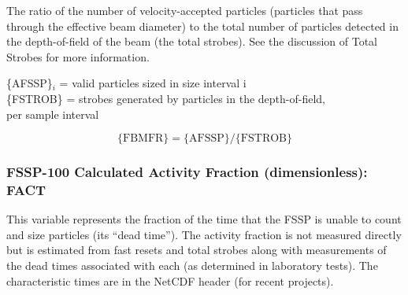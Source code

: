 \documentclass[
  english,
]{book}
\begin{document}
The ratio of the number of velocity-accepted particles (particles that pass through the effective beam diameter) to the total number of particles detected in the depth-of-field of the beam (the total strobes). See the discussion of Total Strobes for more information.

\{AFSSP\}\(_{i}\) = valid particles sized in size interval i\\
\{FSTROB\} = strobes generated by particles in the depth-of-field,\\
\hspace*{0.333em}\hspace*{0.333em}\hspace*{0.333em}\hspace*{0.333em}\hspace*{0.333em}\hspace*{0.333em}\hspace*{0.333em}\hspace*{0.333em}\hspace*{0.333em}\hspace*{0.333em}\hspace*{0.333em}\hspace*{0.333em}\hspace*{0.333em}\hspace*{0.333em}per sample interval

\begin{equation}
\mathrm{\{FBMFR\}=\{AFSSP\}/\{FSTROB\}}
\label{eq:FBMFRbox}
\end{equation}

\hypertarget{fact}{%
\subsubsection*{FSSP-100 Calculated Activity Fraction (dimensionless): FACT}\label{fact}}

This variable represents the fraction of the time that the FSSP is unable to count and size particles (its ``dead time''). The activity fraction is not measured directly but is estimated from fast resets and total strobes along with measurements of the dead times associated with each (as determined in laboratory tests). The characteristic times are in the NetCDF header (for recent projects).
\end{document}
